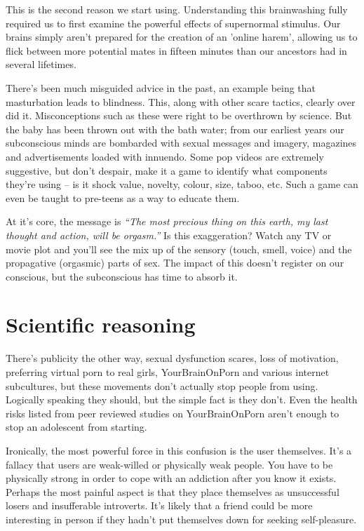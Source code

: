 \documentclass[
]{book}
\begin{document}
This is the second reason we start using. Understanding this brainwashing fully required us to first examine the powerful effects of supernormal stimulus. Our brains simply aren't prepared for the creation of an 'online harem', allowing us to flick between more potential mates in fifteen minutes than our ancestors had in several lifetimes.

There's been much misguided advice in the past, an example being that masturbation leads to blindness. This, along with other scare tactics, clearly over did it. Misconceptions such as these were right to be overthrown by science. But the baby has been thrown out with the bath water; from our earliest years our subconscious minds are bombarded with sexual messages and imagery, magazines and advertisements loaded with innuendo. Some pop videos are extremely suggestive, but don't despair, make it a game to identify what components they're using -- is it shock value, novelty, colour, size, taboo, etc. Such a game can even be taught to pre-teens as a way to educate them.

At it's core, the message is \emph{``The most precious thing on this earth, my last thought and action, will be orgasm.''} Is this exaggeration? Watch any TV or movie plot and you'll see the mix up of the sensory (touch, smell, voice) and the propagative (orgasmic) parts of sex. The impact of this doesn't register on our conscious, but the subconscious has time to absorb it.

\hypertarget{scientific-reasoning}{%
\section{Scientific reasoning}\label{scientific-reasoning}}

There's publicity the other way, sexual dysfunction scares, loss of motivation, preferring virtual porn to real girls, YourBrainOnPorn and various internet subcultures, but these movements don't actually stop people from using. Logically speaking they should, but the simple fact is they don't. Even the health risks listed from peer reviewed studies on YourBrainOnPorn aren't enough to stop an adolescent from starting.

Ironically, the most powerful force in this confusion is the user themselves. It's a fallacy that users are weak-willed or physically weak people. You have to be physically strong in order to cope with an addiction after you know it exists. Perhaps the most painful aspect is that they place themselves as unsuccessful losers and insufferable introverts. It's likely that a friend could be more interesting in person if they hadn't put themselves down for seeking self-pleasure.
\end{document}
